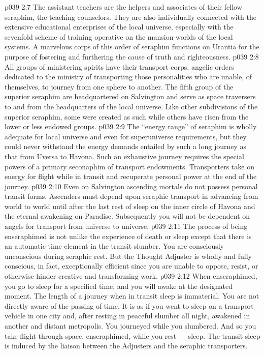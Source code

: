 \vs p039 2:7 \pc {}\bibnobreakspace {} The assistant teachers are the helpers and associates of their fellow seraphim, the teaching counselors. They are also individually connected with the extensive educational enterprises of the local universe, especially with the sevenfold scheme of training operative on the mansion worlds of the local systems. A marvelous corps of this order of seraphim functions on Urantia for the purpose of fostering and furthering the cause of truth and righteousness.
\vs p039 2:8 \pc {}\bibnobreakspace {} All groups of ministering spirits have their transport corps, angelic orders dedicated to the ministry of transporting those personalities who are unable, of themselves, to journey from one sphere to another. The fifth group of the superior seraphim are headquartered on Salvington and serve as space traversers to and from the headquarters of the local universe. Like other subdivisions of the superior seraphim, some were created as such while others have risen from the lower or less endowed groups.
\vs p039 2:9 \pc The “energy range” of seraphim is wholly adequate for local universe and even for superuniverse requirements, but they could never withstand the energy demands entailed by such a long journey as that from Uversa to Havona. Such an exhaustive journey requires the special powers of a primary seconaphim of transport endowments. Transporters take on energy for flight while in transit and recuperate personal power at the end of the journey.
\vs p039 2:10 \pc Even on Salvington ascending mortals do not possess personal transit forms. Ascenders must depend upon seraphic transport in advancing from world to world until after the last rest of sleep on the inner circle of Havona and the eternal awakening on Paradise. Subsequently you will not be dependent on angels for transport from universe to universe.
\vs p039 2:11 The process of being enseraphimed is not unlike the experience of death or sleep except that there is an automatic time element in the transit slumber. You are consciously unconscious during seraphic rest. But the Thought Adjuster is wholly and fully conscious, in fact, exceptionally efficient since you are unable to oppose, resist, or otherwise hinder creative and transforming work.
\vs p039 2:12 When enseraphimed, you go to sleep for a specified time, and you will awake at the designated moment. The length of a journey when in transit sleep is immaterial. You are not directly aware of the passing of time. It is as if you went to sleep on a transport vehicle in one city and, after resting in peaceful slumber all night, awakened in another and distant metropolis. You journeyed while you slumbered. And so you take flight through space, enseraphimed, while you rest --- sleep. The transit sleep is induced by the liaison between the Adjusters and the seraphic transporters.
